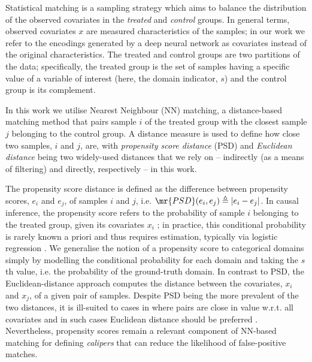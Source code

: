 Statistical matching is a sampling strategy which aims to balance the distribution of the observed
covariates in the \emph{treated} and \emph{control} groups. In general terms, observed covariates
$x$ are measured characteristics of the samples; in our work we refer to the encodings generated by
a deep neural network as covariates instead of the original characteristics.
The treated and control groups are two partitions of the data; specifically, the treated group is
the set of samples having a specific value of a variable of interest (here, the domain indicator, $s$) and
the control group is its complement.

In this work we utilise Nearest Neighbour (NN) matching, a distance-based matching method that pairs
sample $i$ of the treated group with the closest sample $j$ belonging to the control group.
%
A distance measure is used to define how close two samples, $i$ and $j$, are, with \emph{propensity
score distance} (PSD) and \emph{Euclidean distance} being two widely-used distances that we rely on
-- indirectly (as a means of filtering) and directly, respectively -- in this work.

The propensity score distance is defined as the difference between propensity scores, $e_i$
and $e_j$, of samples $i$ and $j$, i.e. $\mr{PSD}(e_i, e_j) \triangleq \vert e_i - e_j \vert$. In
causal inference, the propensity score refers to the probability of sample $i$ belonging to the
treated group, given its covariates $x_i$ \cite{rosenbaum1983central}; in practice, this
conditional probability is rarely known a priori and thus requires estimation, typically via
logistic regression \cite{stuart2010matching}. We generalise the notion of a propensity score to
categorical domains simply by modelling the conditional probability for each domain and
taking the $s$th value, i.e. the probability of the ground-truth domain.
%
In contrast to PSD, the Euclidean-distance approach computes the distance between the covariates,
$x_i$ and $x_j$, of a given pair of samples.
Despite PSD being the more prevalent of the two distances, it is ill-suited to cases
in where pairs are close in value w.r.t. all covariates and in such cases Euclidean distance should
be preferred
\cite{king2019propensity}. 
%
Nevertheless, propensity scores remain a relevant component of NN-based matching for defining
\emph{calipers} that can reduce the likelihood of false-positive matches.
%

